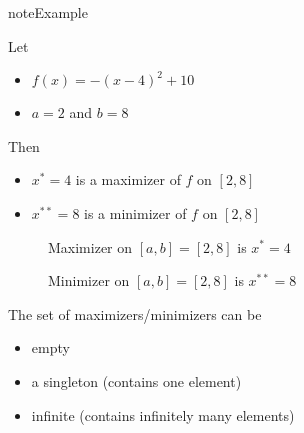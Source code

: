 \documentclass[letterpaper,10pt,english]{jupyterBook}
\begin{document}
\begin{sphinxadmonition}{note}{Example}

\sphinxAtStartPar
Let
\begin{itemize}
\item {} 
\sphinxAtStartPar
\(f(x) = -(x-4)^2 + 10\)

\item {} 
\sphinxAtStartPar
\(a = 2\) and \(b=8\)

\end{itemize}

\sphinxAtStartPar
Then
\begin{itemize}
\item {} 
\sphinxAtStartPar
\(x^* = 4\) is a maximizer of \(f\) on \([2, 8]\)

\item {} 
\sphinxAtStartPar
\(x^{**} = 8\) is a minimizer of \(f\) on \([2, 8]\)

\end{itemize}

\begin{figure}[H]
\centering
\capstart

\noindent{}
\caption{Maximizer on \([a, b] = [2, 8]\) is \(x^* = 4\)}\label{\detokenize{02.optimization_intro:id1}}\end{figure}

\begin{figure}[H]
\centering
\capstart

\noindent{}
\caption{Minimizer on \([a, b] = [2, 8]\) is \(x^{**} = 8\)}\label{\detokenize{02.optimization_intro:id2}}\end{figure}
\end{sphinxadmonition}

\sphinxAtStartPar
The set of maximizers/minimizers can be
\begin{itemize}
\item {} 
\sphinxAtStartPar
empty

\item {} 
\sphinxAtStartPar
a singleton (contains one element)

\item {} 
\sphinxAtStartPar
infinite (contains infinitely many elements)

\end{itemize}
\end{document}
